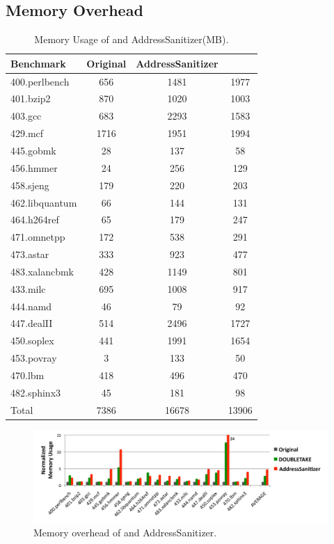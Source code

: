 \subsection{Memory Overhead}
\label{sec:memoverhead}

\begin{table}[t]
\centering
\begin{tabular}{l|c|c|c|}
\textbf{ \small Benchmark} & \textbf{\small Original} &  \textbf{\small AddressSanitizer} & \textbf{\small \doubletake{} } \\
\hline
400.perlbench & 656 &	1481 & 1977 \\
401.bzip2	& 870 &	1020 &	1003 \\
403.gcc	& 683 &	2293 &	1583 \\
429.mcf	& 1716 &	1951 &	1994 \\
445.gobmk &	28 &	137 &	58 \\
456.hmmer &	24 &	256 &	129 \\
458.sjeng & 179 & 220 &	203 \\
462.libquantum	& 66 &	144 &	131 \\
464.h264ref	& 65 &	179 &	247 \\
471.omnetpp	& 172 &	538 &	291 \\
473.astar	& 333 &	923 &	477 \\
483.xalancbmk &	428 & 1149 &	801 \\
433.milc	& 695 &	1008 &	917 \\
444.namd	& 46 &	79 &	92 \\
447.dealII	& 514 &	2496 &	1727 \\
450.soplex	& 441 &	1991 &	1654 \\
453.povray	& 3 &	133 &	50 \\
470.lbm	& 418 &	496 &	470 \\
482.sphinx3 &	45 &	181 & 98 \\
\hline
Total & 7386 & 16678 & 13906 \\
\hline
\end{tabular}
\caption{Memory Usage of \doubletake{} and AddressSanitizer(MB).\label{tbl:memoryoverhead}}
\end{table}


\begin{figure}
\begin{center}
\includegraphics[width=6.5in]{doubletake/figure/memory}
\end{center}
\caption{
Memory overhead of \doubletake{} and AddressSanitizer.
\label{fig:memory}}
\end{figure}

